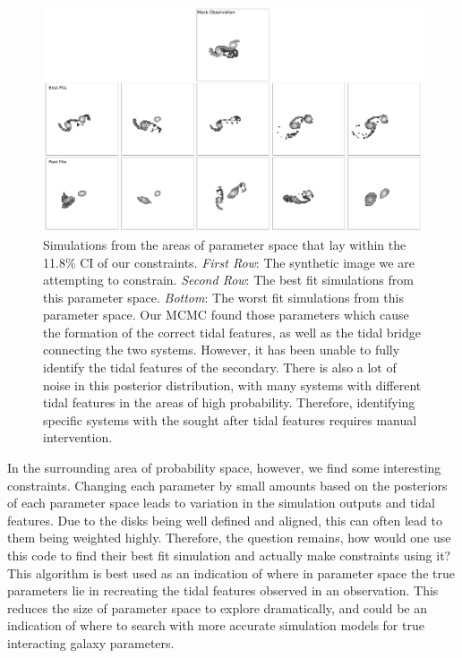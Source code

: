 \begin{figure}
\centering
\includegraphics[width=\textwidth]{Chapter1/figures/best-fits-comb.pdf}
\caption[Simulations from the areas of parameter space that lay within the 11.8\% CI of our constraints.]{Simulations from the areas of parameter space that lay within the 11.8\% CI of our constraints. \textit{First Row}: The synthetic image we are attempting to constrain. \textit{Second Row}: The best fit simulations from this parameter space. \textit{Bottom}: The worst fit simulations from this parameter space. Our MCMC found those parameters which cause the formation of the correct tidal features, as well as the tidal bridge connecting the two systems. However, it has been unable to fully identify the tidal features of the secondary. There is also a lot of noise in this posterior distribution, with many systems with different tidal features in the areas of high probability. Therefore, identifying specific systems with the sought after tidal features requires manual intervention.}
\label{fig:arp240_corner_plot}
\end{figure}

In the surrounding area of probability space, however, we find some interesting constraints. Changing each parameter by small amounts based on the posteriors of each parameter space leads to variation in the simulation outputs and tidal features. Due to the disks being well defined and aligned, this can often lead to them being weighted highly. Therefore, the question remains, how would one use this code to find their best fit simulation and actually make constraints using it? This algorithm is best used as an indication of where in parameter space the true parameters lie in recreating the tidal features observed in an observation. This reduces the size of parameter space to explore dramatically, and could be an indication of where to search with more accurate simulation models for true interacting galaxy parameters.

